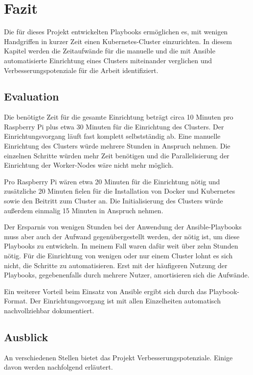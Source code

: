 \chapter{Fazit}\label{ch:fazit}

Die für dieses Projekt entwickelten Playbooks ermöglichen es, mit wenigen Handgriffen in kurzer Zeit einen Kubernetes-Cluster einzurichten.
In diesem Kapitel werden die Zeitaufwände für die manuelle und die mit Ansible automatisierte Einrichtung eines Clusters miteinander verglichen und Verbesserungspotenziale für die Arbeit identifiziert.

\section{Evaluation}

Die benötigte Zeit für die gesamte Einrichtung beträgt circa 10 Minuten pro Raspberry Pi plus etwa 30 Minuten für die Einrichtung des Clusters.
Der Einrichtungsvorgang läuft fast komplett selbstständig ab.
Eine manuelle Einrichtung des Clusters würde mehrere Stunden in Anspruch nehmen.
Die einzelnen Schritte würden mehr Zeit benötigen und die Parallelisierung der Einrichtung der Worker-Nodes wäre nicht mehr möglich.

Pro Raspberry Pi wären etwa 20 Minuten für die Einrichtung nötig und zusätzliche 20 Minuten fielen für die Installation von Docker und Kubernetes sowie den Beitritt zum Cluster an.
Die Initialisierung des Clusters würde außerdem einmalig 15 Minuten in Anspruch nehmen.

Der Ersparnis von wenigen Stunden bei der Anwendung der Ansible-Playbooks muss aber auch der Aufwand gegenübergestellt werden, der nötig ist, um diese Playbooks zu entwickeln.
In meinem Fall waren dafür weit über zehn Stunden nötig.
Für die Einrichtung von wenigen oder nur einem Cluster lohnt es sich nicht, die Schritte zu automatisieren.
Erst mit der häufigeren Nutzung der Playbooks, gegebenenfalls durch mehrere Nutzer, amortisieren sich die Aufwände.

Ein weiterer Vorteil beim Einsatz von Ansible ergibt sich durch das Playbook-Format.
Der Einrichtungsvorgang ist mit allen Einzelheiten automatisch nachvollziehbar dokumentiert.

\section{Ausblick}\label{sec:ausblick}

An verschiedenen Stellen bietet das Projekt Verbesserungspotenziale.
Einige davon werden nachfolgend erläutert.

